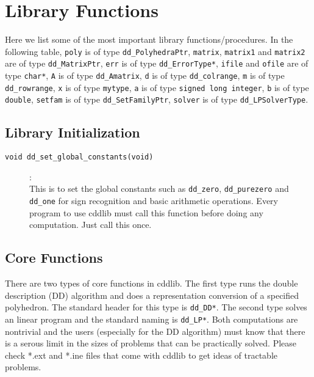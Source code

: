 \documentclass[11pt]{article}
\newcommand {\0} {{\bf 0}}
\begin{document}
\section{Library Functions}  \label{LIBRARY}

Here we list some of the most important library functions/procedures. 
In the following table, {\tt poly} is of type {\tt dd\_PolyhedraPtr},
{\tt matrix}, {\tt matrix1} and {\tt matrix2} are of type {\tt dd\_MatrixPtr},
{\tt err} is of type {\tt dd\_ErrorType*}, {\tt ifile} and {\tt ofile}
are of type {\tt char*}, {\tt A} is of type {\tt dd\_Amatrix},
{\tt d} is of type {\tt dd\_colrange}, {\tt m} is of type {\tt dd\_rowrange},
{\tt x} is of type {\tt mytype}, {\tt a} is of type {\tt signed long integer},
{\tt b} is of type {\tt double},
{\tt setfam} is of type {\tt dd\_SetFamilyPtr},
{\tt solver} is of type {\tt dd\_LPSolverType}.

\subsection{Library Initialization}  \label{Initialization}

\begin{description}

\item[{\tt void dd\_set\_global\_constants(void)}]:\\
This is to set the global constants such as {\tt dd\_zero},
{\tt dd\_purezero} and
{\tt dd\_one} for sign recognition and basic arithmetic
operations.  {Every program to use cddlib must call this function}
before doing any computation.    Just call this once.
\end{description}

\subsection{Core Functions}  \label{CoreLibrary}

There are two types of core functions in cddlib.  The first type
runs the double description (DD) algorithm and does a representation
conversion of a specified polyhedron.  The standard header
for this type is {\tt dd\_DD*}.  The second type solves
an linear program and the standard naming is
{\tt dd\_LP*}.   Both computations are nontrivial
and the users (especially for the DD algorithm) must
know that there is a serous limit in the sizes of problems
that can be practically solved. 
Please check *.ext and *.ine files that come with cddlib to get
ideas of tractable problems. 
\end{document}
